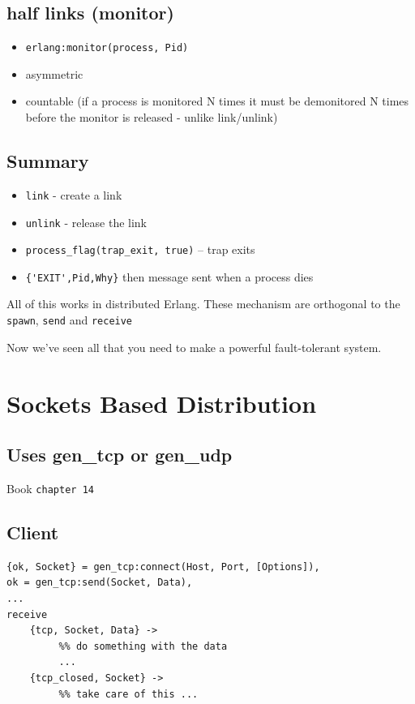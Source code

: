 \documentclass[12pt]{article}
\begin{document}
\subsection{half links (monitor)}
\begin{itemize}
\item \verb+erlang:monitor(process, Pid)+
\item asymmetric
\item countable (if a process is monitored N times it must be demonitored N times
before the monitor is released - unlike link/unlink)
\end{itemize}

\subsection{Summary}
\begin{itemize}
\item \verb+link+ - create a link
\item \verb+unlink+ - release the link
\item \verb+process_flag(trap_exit, true)+ -- trap exits
\item \verb+{'EXIT',Pid,Why}+ then message sent when a process dies
\end{itemize}

All of this works in distributed Erlang. These mechanism are orthogonal to
the \verb+spawn+, \verb+send+ and \verb+receive+

Now we've seen all that you need to make a powerful fault-tolerant system.

\section{Sockets Based Distribution}

\subsection{Uses gen\_tcp or gen\_udp}

Book \verb+chapter 14+

\subsection{Client}

\begin{verbatim}
{ok, Socket} = gen_tcp:connect(Host, Port, [Options]),
ok = gen_tcp:send(Socket, Data),
...
receive
    {tcp, Socket, Data} ->
         %% do something with the data
         ...
    {tcp_closed, Socket} ->
         %% take care of this ...    
\end{verbatim}
\end{document}
